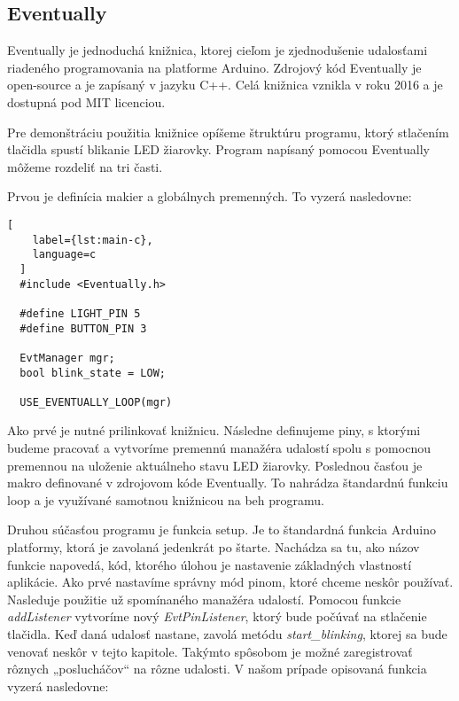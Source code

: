 \subsection{Eventually}
\noindent \par
Eventually je jednoduchá knižnica, ktorej cieľom je zjednodušenie udalosťami riadeného
programovania na platforme Arduino. Zdrojový kód Eventually je open-source a je zapísaný v jazyku C++. Celá knižnica vznikla v roku 2016 a je dostupná pod MIT licenciou.
\par Pre demonštráciu použitia knižnice opíšeme štruktúru programu, ktorý stlačením tlačidla spustí blikanie LED žiarovky. Program napísaný pomocou Eventually môžeme rozdeliť na tri časti.

\par Prvou je definícia makier a globálnych premenných. To vyzerá nasledovne:
\begin{lstlisting}[
    label={lst:main-c},
    language=c
  ]  
  #include <Eventually.h>

  #define LIGHT_PIN 5
  #define BUTTON_PIN 3
  
  EvtManager mgr;
  bool blink_state = LOW;

  USE_EVENTUALLY_LOOP(mgr)
\end{lstlisting}

Ako prvé je nutné prilinkovať knižnicu. Následne definujeme piny, s ktorými budeme pracovať a vytvoríme premennú manažéra udalostí spolu s pomocnou premennou na uloženie aktuálneho stavu LED žiarovky. Poslednou časťou je makro definované v zdrojovom kóde Eventually. To nahrádza štandardnú funkciu loop a je využívané samotnou knižnicou na beh programu.

\par Druhou súčasťou programu je funkcia setup. Je to štandardná funkcia Arduino platformy, ktorá je zavolaná
jedenkrát po štarte. Nachádza sa tu, ako názov funkcie napovedá, kód, ktorého úlohou je
nastavenie základných vlastností aplikácie. Ako prvé nastavíme správny mód pinom, ktoré chceme neskôr používať. Nasleduje použitie už
spomínaného manažéra udalostí. Pomocou funkcie \textit{addListener} vytvoríme nový \textit{EvtPinListener}, ktorý bude počúvať na stlačenie tlačidla.
Keď daná udalosť nastane, zavolá metódu \textit{start\_blinking}, ktorej sa bude venovať neskôr v tejto kapitole.
Takýmto spôsobom je možné zaregistrovať rôznych  „poslucháčov“  na rôzne udalosti. V našom prípade opisovaná funkcia vyzerá nasledovne:

